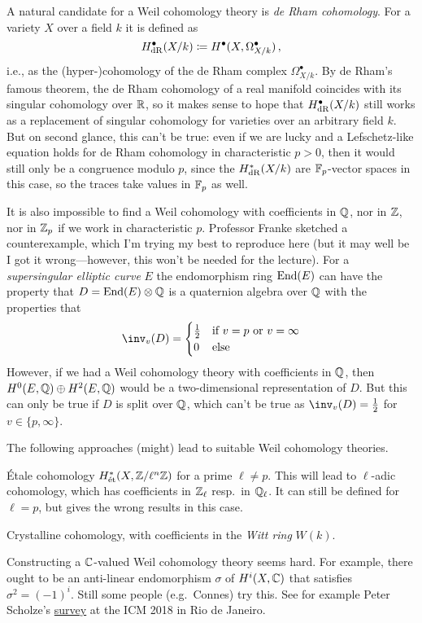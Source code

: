 \begin{cntx}
A natural candidate for a Weil cohomology theory is \emph{de Rham cohomology}. For a variety $X$ over a field $k$ it is defined as 
\begin{equation*}
	H_{\mathrm{dR}}^ \bullet(X/k)\coloneqq H^ \bullet(X,\Omega_{X/k}^\bullet)\,,
\end{equation*}
i.e., as the (hyper-)cohomology of the de Rham complex $\Omega_{X/k}^\bullet$.	By de Rham's famous theorem, the de Rham cohomology of a real manifold coincides with its singular cohomology over $\mathbb{R}$, so it makes sense to hope that $H_{\mathrm{dR}}^ \bullet(X/k)$ still works as a replacement of singular cohomology for varieties over an arbitrary field $k$. But on second glance, this can't be true: even if we are lucky and a Lefschetz-like equation holds for de Rham cohomology in characteristic $p >0$, then it would still only be a congruence modulo $p$, since the $H_{\mathrm{dR}}^*(X/k)$ are $\mathbb{F}_p$-vector spaces in this case, so the traces take values in $\mathbb{F}_p$ as well.
\end{cntx}
\begin{cntx}
It is also impossible to find a Weil cohomology with coefficients in $\mathbb{Q}$, nor in $\mathbb{Z}$, nor in $\mathbb{Z}_p$ if we work in characteristic $p$. Professor Franke sketched a counterexample, which I'm trying my best to reproduce here (but it may well be I got it wrong---however, this won't be needed for the lecture). For a \emph{supersingular elliptic curve} $E$ the endomorphism ring $\operatorname{End}(E)$ can have the property that $D=\operatorname{End}(E)\otimes \mathbb{Q}$ is a quaternion algebra over $\mathbb{Q}$ with the properties that
\begin{align*}
	\inv_v(D)=\begin{cases}
		\frac{1}{2} & \text{if }v=p\text{ or }v=\infty\\
		0 & \text{else}
	\end{cases}
\end{align*}
However, if we had a Weil cohomology theory with coefficients in $\mathbb{Q}$, then $H^0(E,\mathbb{Q})\oplus H^2(E,\mathbb{Q})$ would be a two-dimensional representation of $D$. But this can only be true if $D$ is split over $\mathbb{Q}$, which can't be true as $\inv_v(D)=\frac12$ for $v\in\{p,\infty\}$.
\end{cntx}
 The following approaches (might) lead to suitable Weil cohomology theories.
\begin{alphanumerate}
	\item Étale cohomology $H_{\mathrm{\acute{e}t}}^*(X,\mathbb{Z}/\ell^n\mathbb{Z})$ for a prime $\ell\neq p$. This will lead to $\ell$-adic cohomology, which has coefficients in $\mathbb{Z}_\ell$ resp.\ in $\mathbb{Q}_\ell$. It can still be defined for $\ell=p$, but gives the wrong results in this case.
	\item Crystalline cohomology, with coefficients in the \emph{Witt ring} $W(k)$.
	\item Constructing a $\mathbb{C}$-valued Weil cohomology theory seems hard. For example, there ought to be an anti-linear endomorphism $\sigma$ of $H^i(X,\mathbb{C})$ that satisfies $\sigma^2=(-1)^i$. Still some people (e.g.\ Connes) try this. See for example Peter Scholze's \href{http://www.math.uni-bonn.de/people/scholze/Rio.pdf}{survey} at the ICM 2018 in Rio de Janeiro.
\end{alphanumerate}
